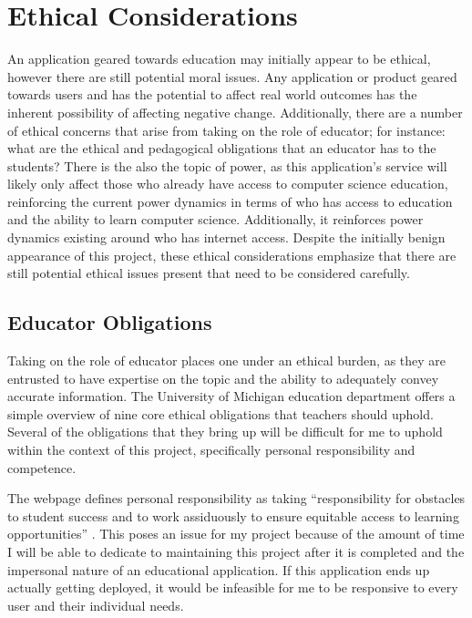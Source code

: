 \documentclass[10pt,twocolumn]{article}
\begin{document}
\section{Ethical Considerations}

An application geared towards education may initially appear to be ethical, however there are still potential moral issues. 
Any application or product geared towards 
users and has the potential to affect real world outcomes has the inherent possibility of affecting negative change. 
Additionally, there are a number of ethical concerns that arise from taking on the role of educator; for instance: what 
are the ethical and pedagogical obligations that an educator has to the students? There is the also the topic of power, as this 
application’s service will likely only affect those who already have 
access to computer science education, reinforcing the current power dynamics in terms of who has access to education and 
the ability to learn computer science. Additionally, it reinforces power dynamics existing around who has internet 
access. Despite the initially benign appearance of this project, these ethical 
considerations emphasize that there are still potential ethical issues present that need to be considered carefully. 

\subsection{Educator Obligations}

Taking on the role of educator places one under an ethical burden, as they are entrusted to have expertise on 
the topic and the ability to adequately convey accurate information. The University of Michigan education department 
offers a simple overview of nine core ethical obligations that teachers should uphold. Several of the obligations that 
they bring up will be difficult for me to uphold within the context of this project, specifically
personal responsibility and competence. 

The webpage defines personal responsibility as taking “responsibility for obstacles to student success and to work 
assiduously to ensure equitable access to learning opportunities” \cite{MichiganEducation}. This poses an issue for 
my project because of the amount of time I will be able to dedicate to maintaining this project after it is completed 
and the impersonal nature of an educational application. If this application ends up actually getting deployed, it would 
be infeasible for me to be responsive to every user and their individual needs. 
\end{document}
